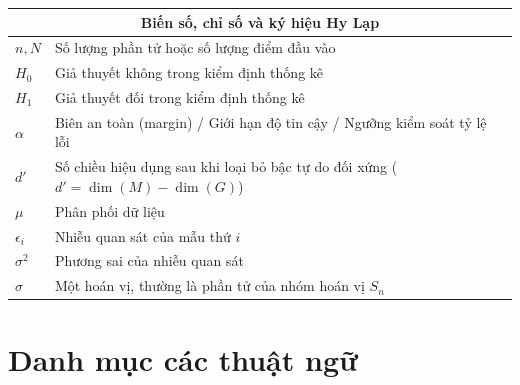 \documentclass[oneside]{hcmus-report}
\theoremstyle{plain}
\theoremstyle{definition}
\begin{document}
\begin{longtable}{p{} p{}}
\multicolumn{2}{c}{\textbf{Biến số, chỉ số và ký hiệu Hy Lạp}} \\
\hline
$n, N$ & Số lượng phần tử hoặc số lượng điểm đầu vào \\
$H_0$ & Giả thuyết không trong kiểm định thống kê \\
$H_1$ & Giả thuyết đối trong kiểm định thống kê \\
$\alpha$ & Biên an toàn (margin) / Giới hạn độ tin cậy / Ngưỡng kiểm soát tỷ lệ lỗi \\
$d'$ & Số chiều hiệu dụng sau khi loại bỏ bậc tự do đối xứng ($d' = \dim(M) - \dim(G)$) \\
$\mu$ & Phân phối dữ liệu \\
$\epsilon_i$ & Nhiễu quan sát của mẫu thứ $i$ \\
$\sigma^2$ & Phương sai của nhiễu quan sát \\
$\sigma$ & Một hoán vị, thường là phần tử của nhóm hoán vị $S_n$ \\

\hline
\end{longtable}

\clearpage
{}

\section*{Danh mục các thuật ngữ}
\end{document}
